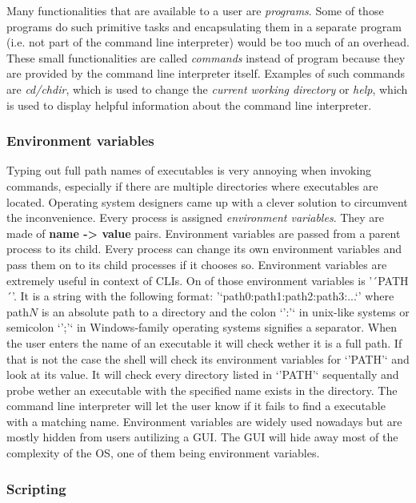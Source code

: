 Many functionalities that are available to a user are \textit{programs}. Some of those programs do such primitive
tasks and encapsulating them in a separate program (i.e. not part of the command line interpreter) would
be too much of an overhead. These small functionalities are called \textit{commands} instead of program because
they are provided by the command line interpreter itself. Examples of such commands are \textit{cd/chdir}, which
is used to change the \textit{current working directory} or \textit{help}, which is used to display helpful information
about the command line interpreter.

\subsubsection{Environment variables}

Typing out full path names of executables is very annoying when invoking commands, especially if there
are multiple directories where executables are located. Operating system designers came up with a clever
solution to circumvent the inconvenience. Every process is assigned \textit{environment variables}. They are
made of \textbf{name -> value} pairs. Environment variables are passed from a parent process to its child.
Every process can change its own environment variables and pass them on to its child processes if it
chooses so. Environment variables are extremely useful in context of CLIs. On of those environment
variables is '´PATH´'. It is a string with the following format: '`path0:path1:path2:path3:...`' where
path$N$ is an absolute path to a directory and the colon `':'` in unix-like systems or semicolon `';'`
in Windows-family operating systems signifies a separator. When the user enters the name of an 
executable it will check wether it is a full path. If that is not the case the shell will check its
environment variables for `'PATH'` and look at its value. It will check every directory listed in
`'PATH'` sequentally and probe wether an executable with the specified name exists in the directory.
The command line interpreter will let the user know if it fails to find a executable with a matching
name. Environment variables are widely used nowadays but are mostly hidden from users autilizing a GUI.
The GUI will hide away most of the complexity of the OS, one of them being environment variables.


\subsubsection{Scripting}

